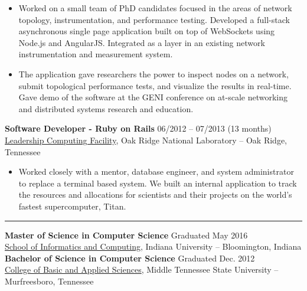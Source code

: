 \documentclass[12pt,letterpaper]{article}
\begin{document}
\begin{itemize}

  \item Worked on a small team of PhD candidates focused in the areas of network topology, instrumentation, and performance testing. Developed a full-stack asynchronous single page application built on top of WebSockets using Node.js and AngularJS. Integrated as a layer in an existing network instrumentation and measurement system.

  \item The application gave researchers the power to inspect nodes on a network, submit topological performance tests, and visualize the results in real-time. Gave demo of the software at the GENI conference on at-scale networking and distributed systems research and education.

\end{itemize}


\noindent\textbf{Software Developer - Ruby on Rails}
\hfill{06/2012 -- 07/2013 (13 months)} \\
\href{https://www.olcf.ornl.gov/}{Leadership Computing Facility}, Oak Ridge National Laboratory -- Oak Ridge, Tennessee

\begin{itemize}

	\item Worked closely with a mentor, database engineer, and system administrator to replace a terminal based system. We built an internal application to track the resources and allocations for scientists and their projects on the world’s fastest supercomputer, Titan.

\end{itemize}

\noindent\rule{7.5in}{0.4pt}

\noindent\textbf{Master of Science in Computer Science}
\hfill{Graduated May 2016} \\
\href{https://luddy.indiana.edu/}{School of Informatics and Computing}, Indiana University -- Bloomington, Indiana \\

\noindent\textbf{Bachelor of Science in Computer Science}
\hfill{Graduated Dec. 2012} \\
\href{https://www.mtsu.edu/cbas/}{College of Basic and Applied Sciences}, Middle Tennessee State University -- Murfreesboro, Tennessee
\end{document}
